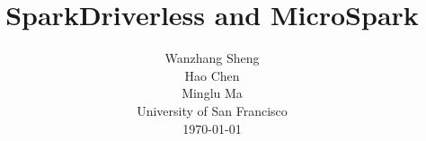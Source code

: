 \documentclass[twocolumn]{article}
\title{SparkDriverless and MicroSpark}
\author{Wanzhang Sheng \\
Hao Chen \\
Minglu Ma \\
University of San Francisco\\
\today \\
}
\begin{document}
\maketitle










\small


\end{document}

